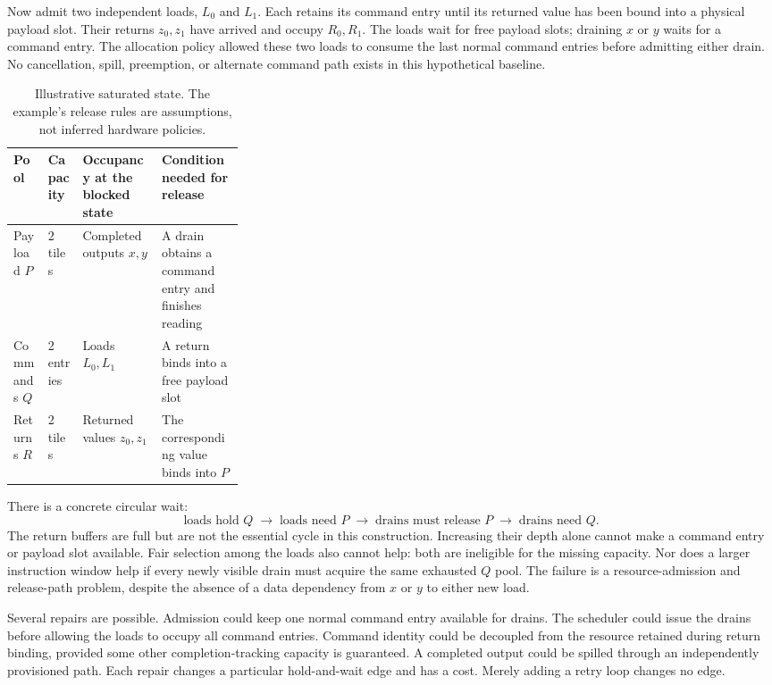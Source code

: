 Now admit two independent loads, $L_0$ and $L_1$. Each retains its command entry until its returned value has been bound into a physical payload slot. Their returns $z_0,z_1$ have arrived and occupy $R_0,R_1$. The loads wait for free payload slots; draining $x$ or $y$ waits for a command entry. The allocation policy allowed these two loads to consume the last normal command entries before admitting either drain. No cancellation, spill, preemption, or alternate command path exists in this hypothetical baseline.

\begin{table}[tbp]
\centering
\small
\begin{tabularx}{\linewidth}{@{}p{0.15\linewidth}p{0.15\linewidth}XX@{}}
\toprule
Pool & Capacity & Occupancy at the blocked state & Condition needed for release \\
\midrule
Payload $P$ & 2 tiles & Completed outputs $x,y$ & A drain obtains a command entry and finishes reading \\
Commands $Q$ & 2 entries & Loads $L_0,L_1$ & A return binds into a free payload slot \\
Returns $R$ & 2 tiles & Returned values $z_0,z_1$ & The corresponding value binds into $P$ \\
\bottomrule
\end{tabularx}
\caption{Illustrative saturated state. The example's release rules are assumptions, not inferred hardware policies.}
\label{tab:u008-blocked}
\end{table}

There is a concrete circular wait:
\begin{equation}
 \text{loads hold }Q
 \;\longrightarrow\;
 \text{loads need }P
 \;\longrightarrow\;
 \text{drains must release }P
 \;\longrightarrow\;
 \text{drains need }Q.
 \label{eq:u008-cycle}
\end{equation}
The return buffers are full but are not the essential cycle in this construction. Increasing their depth alone cannot make a command entry or payload slot available. Fair selection among the loads also cannot help: both are ineligible for the missing capacity. Nor does a larger instruction window help if every newly visible drain must acquire the same exhausted $Q$ pool. The failure is a resource-admission and release-path problem, despite the absence of a data dependency from $x$ or $y$ to either new load.

Several repairs are possible. Admission could keep one normal command entry available for drains. The scheduler could issue the drains before allowing the loads to occupy all command entries. Command identity could be decoupled from the resource retained during return binding, provided some other completion-tracking capacity is guaranteed. A completed output could be spilled through an independently provisioned path. Each repair changes a particular hold-and-wait edge and has a cost. Merely adding a retry loop changes no edge.

